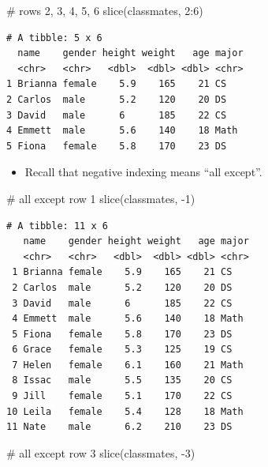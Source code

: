\documentclass[
  letterpaper,
  DIV=11,
  numbers=noendperiod]{scrreprt}
\newenvironment{Shaded}{\begin{snugshade}}{\end{snugshade}}
\newcommand{\CommentTok}[1]{\textcolor[rgb]{0.37,0.37,0.37}{#1}}
\newcommand{\DecValTok}[1]{\textcolor[rgb]{0.68,0.00,0.00}{#1}}
\newcommand{\FunctionTok}[1]{\textcolor[rgb]{0.28,0.35,0.67}{#1}}
\newcommand{\NormalTok}[1]{\textcolor[rgb]{0.00,0.23,0.31}{#1}}
\newcommand{\SpecialCharTok}[1]{\textcolor[rgb]{0.37,0.37,0.37}{#1}}
\providecommand{\tightlist}{%
  \setlength{\itemsep}{0pt}\setlength{\parskip}{0pt}}\usepackage{longtable,booktabs,array}
\begin{document}
\begin{Shaded}
\begin{Highlighting}[]
\CommentTok{\# rows 2, 3, 4, 5, 6}
\FunctionTok{slice}\NormalTok{(classmates, }\DecValTok{2}\SpecialCharTok{:}\DecValTok{6}\NormalTok{)}
\end{Highlighting}
\end{Shaded}

\begin{verbatim}
# A tibble: 5 x 6
  name    gender height weight   age major
  <chr>   <chr>   <dbl>  <dbl> <dbl> <chr>
1 Brianna female    5.9    165    21 CS   
2 Carlos  male      5.2    120    20 DS   
3 David   male      6      185    22 CS   
4 Emmett  male      5.6    140    18 Math 
5 Fiona   female    5.8    170    23 DS   
\end{verbatim}

\begin{itemize}
\tightlist
\item
  Recall that negative indexing means ``all except''.
\end{itemize}

\begin{Shaded}
\begin{Highlighting}[]
\CommentTok{\# all except row 1}
\FunctionTok{slice}\NormalTok{(classmates, }\SpecialCharTok{{-}}\DecValTok{1}\NormalTok{)}
\end{Highlighting}
\end{Shaded}

\begin{verbatim}
# A tibble: 11 x 6
   name    gender height weight   age major
   <chr>   <chr>   <dbl>  <dbl> <dbl> <chr>
 1 Brianna female    5.9    165    21 CS   
 2 Carlos  male      5.2    120    20 DS   
 3 David   male      6      185    22 CS   
 4 Emmett  male      5.6    140    18 Math 
 5 Fiona   female    5.8    170    23 DS   
 6 Grace   female    5.3    125    19 CS   
 7 Helen   female    6.1    160    21 Math 
 8 Issac   male      5.5    135    20 CS   
 9 Jill    female    5.1    170    22 CS   
10 Leila   female    5.4    128    18 Math 
11 Nate    male      6.2    210    23 DS   
\end{verbatim}

\begin{Shaded}
\begin{Highlighting}[]
\CommentTok{\# all except row 3}
\FunctionTok{slice}\NormalTok{(classmates, }\SpecialCharTok{{-}}\DecValTok{3}\NormalTok{)}
\end{Highlighting}
\end{Shaded}
\end{document}
